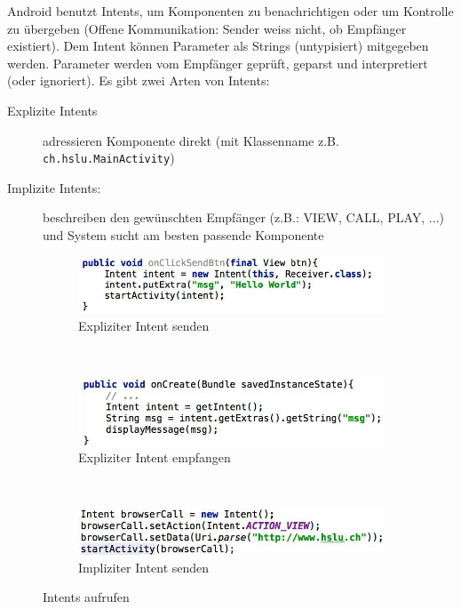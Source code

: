 Android benutzt Intents, um Komponenten zu benachrichtigen oder um Kontrolle zu übergeben (Offene Kommunikation: Sender weiss nicht, ob Empfänger existiert). Dem Intent können Parameter als Strings (untypisiert) mitgegeben werden. Parameter werden vom Empfänger geprüft, geparst und interpretiert (oder ignoriert). Es gibt zwei Arten von Intents:
\begin{description}
	\item[Explizite Intents] adressieren Komponente direkt (mit Klassenname z.B. \texttt{ch.hslu.MainActivity})  
	\item[Implizite Intents:] beschreiben den gewünschten Empfänger (z.B.: VIEW, CALL, PLAY, ...) und System sucht am besten passende Komponente
\end{description}
\begin{figure}
	\centering
	\begin{subfigure}[b]{0.48\textwidth}
		\includegraphics[width=\textwidth]{fig/send-explizit-intent}
		\caption{Expliziter Intent senden}
		\label{fig:send-explizit-intent}
	\end{subfigure}
	~
	\begin{subfigure}[b]{0.48\textwidth}
		\includegraphics[width=\textwidth]{fig/receive-explizit-intent}
		\caption{Expliziter Intent empfangen}
		\label{fig:receive-explizit-intent}
	\end{subfigure}
	~
	\begin{subfigure}[b]{0.48\textwidth}
		\includegraphics[width=\textwidth]{fig/send-implizit-intent}
		\caption{Impliziter Intent senden}
		\label{fig:send-implizit-intent}
	\end{subfigure}
	\caption{Intents aufrufen}
\end{figure}
